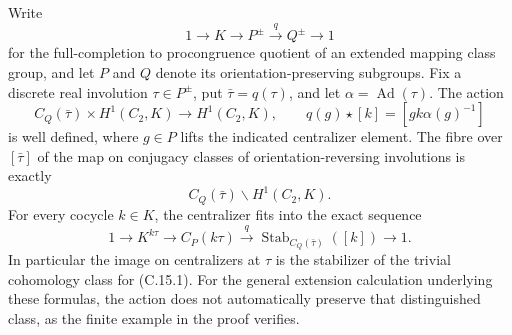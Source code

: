 \begin{proposition}
\label{C-congruence-fibre-action}
Write
\[
 1\longrightarrow K\longrightarrow P^{\pm}
       \xrightarrow{q} Q^{\pm}\longrightarrow1
\]
for the full-completion to procongruence quotient of an extended
mapping class group, and let $P$ and $Q$ denote its
orientation-preserving subgroups. Fix a discrete real involution
$\tau\in P^{\pm}$, put $\bar\tau=q(\tau)$, and let
$\alpha=\operatorname{Ad}(\tau)$. The action
\[
 C_Q(\bar\tau)\times H^1(C_2,K)\longrightarrow H^1(C_2,K),
 \qquad q(g)\star[k]=[gk\alpha(g)^{-1}]
\tag{C.15.1}
\]
is well defined, where $g\in P$ lifts the indicated centralizer
element. The fibre over $[\bar\tau]$ of the map on conjugacy
classes of orientation-reversing involutions is exactly
\[
 C_Q(\bar\tau)\backslash H^1(C_2,K).
\tag{C.15.2}
\]
For every cocycle $k\in K$, the centralizer fits into the exact
sequence
\[
 1\longrightarrow K^{k\tau}\longrightarrow C_P(k\tau)
 \xrightarrow{q}
 \operatorname{Stab}_{C_Q(\bar\tau)}([k])
 \longrightarrow1.
\tag{C.15.3}
\]
In particular the image on centralizers at $\tau$ is the
stabilizer of the trivial cohomology class for (C.15.1).
For the general extension calculation underlying these formulas,
the action does not automatically preserve that distinguished
class, as the finite example in the proof verifies.
\end{proposition}
